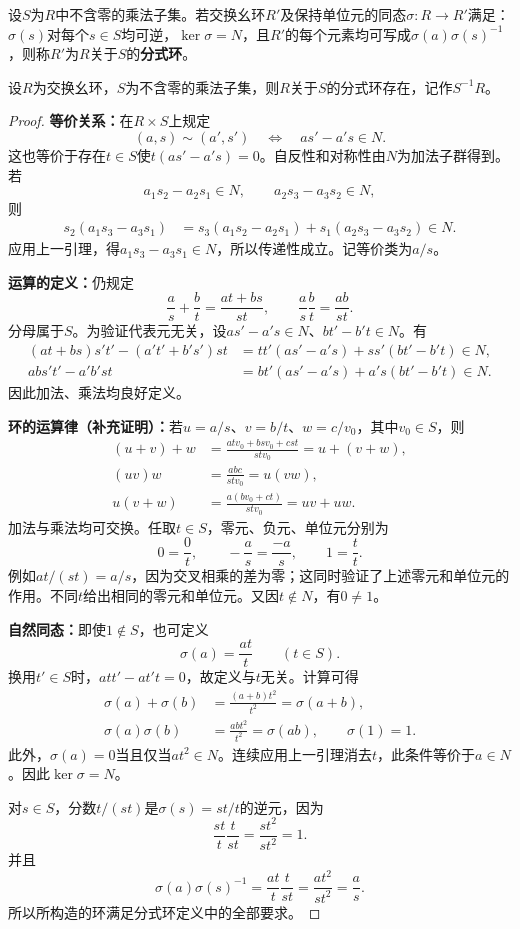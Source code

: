 \begin{definition}
设$S$为$R$中不含零的乘法子集。若交换幺环$R'$及保持单位元的同态$\sigma:R\to R'$满足：$\sigma(s)$对每个$s\in S$均可逆，$\ker\sigma=N$，且$R'$的每个元素均可写成$\sigma(a)\sigma(s)^{-1}$，则称$R'$为$R$关于$S$的\textbf{分式环}。
\end{definition}

\begin{theorem}\label{p2:localization-existence}
设$R$为交换幺环，$S$为不含零的乘法子集，则$R$关于$S$的分式环存在，记作$S^{-1}R$。
\end{theorem}
\begin{proof}
\textbf{等价关系：}在$R\times S$上规定
\[
(a,s)\sim(a',s')\quad\Longleftrightarrow\quad as'-a's\in N.
\]
这也等价于存在$t\in S$使$t(as'-a's)=0$。自反性和对称性由$N$为加法子群得到。若
\[
a_1s_2-a_2s_1\in N,\qquad a_2s_3-a_3s_2\in N,
\]
则
\begin{align*}
s_2(a_1s_3-a_3s_1)
&=s_3(a_1s_2-a_2s_1)+s_1(a_2s_3-a_3s_2)\in N.
\end{align*}
应用上一引理，得$a_1s_3-a_3s_1\in N$，所以传递性成立。记等价类为$a/s$。

\textbf{运算的定义：}仍规定
\[
\frac as+\frac bt=\frac{at+bs}{st},\qquad
\frac as\frac bt=\frac{ab}{st}.
\]
分母属于$S$。为验证代表元无关，设$as'-a's\in N$、$bt'-b't\in N$。有
\begin{align*}
(at+bs)s't'-(a't'+b's')st
&=tt'(as'-a's)+ss'(bt'-b't)\in N,\\
ab s't'-a'b'st
&=bt'(as'-a's)+a's(bt'-b't)\in N.
\end{align*}
因此加法、乘法均良好定义。

\textbf{环的运算律（补充证明）：}若$u=a/s$、$v=b/t$、$w=c/v_0$，其中$v_0\in S$，则
\begin{align*}
(u+v)+w&=\frac{atv_0+bsv_0+cst}{stv_0}=u+(v+w),\\
(uv)w&=\frac{abc}{stv_0}=u(vw),\\
u(v+w)&=\frac{a(bv_0+ct)}{stv_0}=uv+uw.
\end{align*}
加法与乘法均可交换。任取$t\in S$，零元、负元、单位元分别为
\[
0=\frac0t,\qquad -\frac as=\frac{-a}{s},\qquad 1=\frac tt.
\]
例如$at/(st)=a/s$，因为交叉相乘的差为零；这同时验证了上述零元和单位元的作用。不同$t$给出相同的零元和单位元。又因$t\notin N$，有$0\ne1$。

\textbf{自然同态：}即使$1\notin S$，也可定义
\[
\sigma(a)=\frac{at}{t}\qquad(t\in S).
\]
换用$t'\in S$时，$att'-at't=0$，故定义与$t$无关。计算可得
\begin{align*}
\sigma(a)+\sigma(b)&=\frac{(a+b)t^2}{t^2}=\sigma(a+b),\\
\sigma(a)\sigma(b)&=\frac{abt^2}{t^2}=\sigma(ab),\qquad \sigma(1)=1.
\end{align*}
此外，$\sigma(a)=0$当且仅当$at^2\in N$。连续应用上一引理消去$t$，此条件等价于$a\in N$。因此$\ker\sigma=N$。

对$s\in S$，分数$t/(st)$是$\sigma(s)=st/t$的逆元，因为
\[
\frac{st}{t}\frac{t}{st}=\frac{st^2}{st^2}=1.
\]
并且
\[
\sigma(a)\sigma(s)^{-1}
=\frac{at}{t}\frac{t}{st}
=\frac{at^2}{st^2}=\frac as.
\]
所以所构造的环满足分式环定义中的全部要求。
\end{proof}

